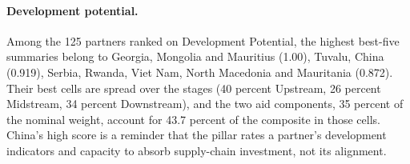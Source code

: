\paragraph{Development potential.} Among the 125 partners ranked on Development Potential, the
highest best-five summaries belong to Georgia, Mongolia and Mauritius (1.00), Tuvalu, China
(0.919), Serbia, Rwanda, Viet Nam, North Macedonia and Mauritania (0.872). Their best cells are
spread over the stages (40 percent Upstream, 26 percent Midstream, 34 percent Downstream), and the
two aid components, 35 percent of the nominal weight, account for 43.7 percent of the composite in
those cells. China's high score is a reminder that the pillar rates a partner's development
indicators and capacity to absorb supply-chain investment, not its alignment.
